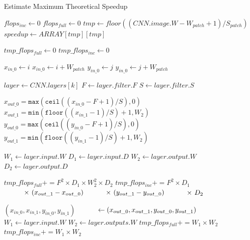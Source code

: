 \documentclass[10, sigconf]{acmart}
\begin{document}
\begin{algorithm}
\caption{Estimate Maximum Theoretical Speedup}\label{alg:max-speedup}
\begin{algorithmic}[1]
\State $flops_{inc} \gets 0$
\State $flops_{full} \gets 0$
\State $tmp \gets floor((CNN.image.W-W_{patch}+1)/S_{patch})$
\State $speedup \gets ARRAY[tmp][tmp]$

      \State $tmp\_flops_{full} \gets 0$
      \State $tmp\_flops_{inc} \gets 0$
      
      \State $x_{in\_0} \gets i$
      \State $x_{in\_0} \gets i + W_{patch}$
      \State $y_{in\_0} \gets j$
      \State $y_{in\_0} \gets j + W_{patch}$

          \State $layer \gets CNN.layers[k]$
            \State $F \gets layer.filter.F$
            \State $S \gets layer.filter.S$
            
            \State $x_{out\_0} = \texttt{max}(\texttt{ceil}((x_{in\_0} - F + 1)/S), 0)$
            \State $x_{out\_1} = \texttt{min}(\texttt{floor}((x_{in\_1} - 1)/S) + 1, W_2)$
            \State $y_{out\_0} = \texttt{max}(\texttt{ceil}((y_{in\_0} - F + 1)/S), 0)$
            \State $y_{out\_1} = \texttt{min}(\texttt{floor}((y_{in\_1} - 1)/S) + 1, W_2)$

              \State $W_1 \gets layer.input.W$
              \State $D_1 \gets layer.input.D$
              \State $W_2 \gets layer.output.W$
              \State $D_2 \gets layer.output.D$

              \State $tmp\_flops_{full} \mathrel{{+}{=}} F^2 \times D_1\times W_2^2\times D_2$
              \State $tmp\_flops_{inc} \mathrel{{+}{=}} F^2 \times D_1$
              \State $\hspace{10mm} \times ~(x_{out\_1} - x_{out\_0})$
              \State $\hspace{10mm} \times ~(y_{out\_1} - y_{out\_0})$
              \State $\hspace{10mm} \times ~D_2$
            \EndIf

            \State $(x_{in\_0}, x_{in\_1}, y_{in\_0}, y_{in\_1})$
            \State $\hspace{10mm} \gets (x_{out\_0}, x_{out\_1}, y_{out\_0}, y_{out\_1})$
            \State $W_1 \gets layer.input.W$
            \State $W_2 \gets layer.outputs.W$
            \State $tmp\_flops_{full} \mathrel{{+}{=}} W_1 \times W_2$
            \State $tmp\_flops_{inc} \mathrel{{+}{=}} W_1 \times W_2$
          \EndIf
      \EndFor


\end{algorithmic}
\end{algorithm}
\end{document}
